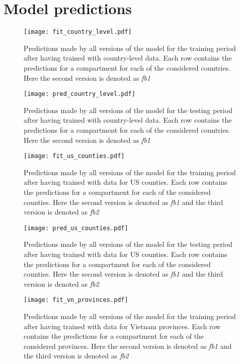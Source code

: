 \appendix

\chapter{Model predictions}

\begin{figure}[!htb]
    \centering
    \texttt{[image: fit\_country\_level.pdf]}
    \caption{Predictions made by all versions of the model for the training period after having trained with country-level data. Each row contains the predictions for a compartment for each of the considered countries. Here the second version is denoted as \textit{fb1}}
    \label{fig:fit-country-level}
\end{figure}

\begin{figure}[!htb]
    \centering
    \texttt{[image: pred\_country\_level.pdf]}
    \caption{Predictions made by all versions of the model for the testing period after having trained with country-level data. Each row contains the predictions for a compartment for each of the considered countries. Here the second version is denoted as \textit{fb1}}
    \label{fig:pred-country-level}
\end{figure}

\begin{figure}[!htb]
    \centering
    \texttt{[image: fit\_us\_counties.pdf]}
    \caption{Predictions made by all versions of the model for the training period after having trained with data for \gls{US} counties. Each row contains the predictions for a compartment for each of the considered counties. Here the second version is denoted as \textit{fb1} and the third version is denoted as \textit{fb2}}
    \label{fig:fit-us-counties}
\end{figure}

\begin{figure}[!htb]
    \centering
    \texttt{[image: pred\_us\_counties.pdf]}
    \caption{Predictions made by all versions of the model for the testing period after having trained with data for \gls{US} counties. Each row contains the predictions for a compartment for each of the considered counties. Here the second version is denoted as \textit{fb1} and the third version is denoted as \textit{fb2}}
    \label{fig:pred-us-counties}
\end{figure}

\begin{figure}[!htb]
    \centering
    \texttt{[image: fit\_vn\_provinces.pdf]}
    \caption{Predictions made by all versions of the model for the training period after having trained with data for Vietnam provinces. Each row contains the predictions for a compartment for each of the considered provinces. Here the second version is denoted as \textit{fb1} and the third version is denoted as \textit{fb2}}
    \label{fig:fit-vn-provinces}
\end{figure}

